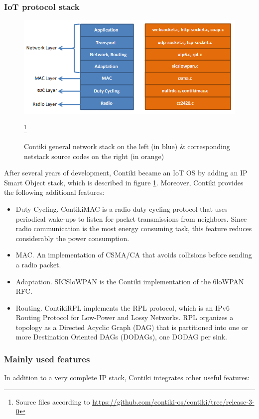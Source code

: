 \subsubsection{IoT protocol stack}
\begin{figure}[htb]
	\centering
	\includegraphics[width=1\columnwidth]{chapters/background.images/Contikinetstack.png}
	\caption{Contiki general network stack on the left (in blue) \& corresponding  netstack source codes on the right (in orange)}\footnote{Source files according to \url{https://github.com/contiki-os/contiki/tree/release-3-0}}
	\label{fig:ContikiNetStack}
\end{figure}
After several years of development, Contiki became an IoT OS by adding an IP Smart Object stack, which is described in figure \ref{fig:ContikiNetStack}.
Moreover, Contiki provides the following additional features:
\begin{itemize}
	\item Duty Cycling. ContikiMAC\cite{dunkels2011contikimac} is a radio duty cycling protocol that uses periodical wake-ups to listen for packet transmissions from neighbors.
	Since radio communication is the most energy consuming task, this feature reduces considerably the power consumption.
	\item MAC. An implementation of CSMA/CA that avoids collisions before sending a radio packet.
	\item Adaptation. SICSloWPAN is the Contiki implementation of the 6loWPAN RFC\cite{rfc4944}.
	\item Routing. ContikiRPL\cite{tsiftes2010contikirpl} implements the RPL\cite{rfc6550} protocol, which is an IPv6 Routing Protocol for Low-Power and Lossy Networks. RPL organizes a	topology as a Directed Acyclic Graph (DAG) that is partitioned into one or more Destination Oriented DAGs (DODAGs), one DODAG per sink.
\end{itemize}

\subsubsection{Mainly used features}
In addition to a very complete IP stack, Contiki integrates other useful features:

